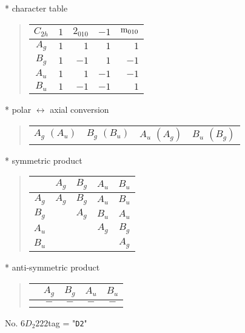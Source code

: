 \documentclass[fleqn,10pt,landscape]{jsarticle}
\begin{document}
* character table
\begin{quote}
\begin{tabular}{crrrr} \hline \hline
$ C_{2h} $ & $ 1 $ & $ 2{}_{010} $ & $ -1 $ & $ {\rm m}_{010} $ \\ \hline
$ A_{g} $ & $ 1 $ & $ 1 $ & $ 1 $ & $ 1 $ \\
$ B_{g} $ & $ 1 $ & $ -1 $ & $ 1 $ & $ -1 $ \\
$ A_{u} $ & $ 1 $ & $ 1 $ & $ -1 $ & $ -1 $ \\
$ B_{u} $ & $ 1 $ & $ -1 $ & $ -1 $ & $ 1 $ \\
 \hline \hline
\end{tabular}
\end{quote}
* polar $\leftrightarrow$ axial conversion
\begin{quote}
\begin{tabular}{cccc}
$ A_{g}\,\,(A_{u}) $ & $ B_{g}\,\,(B_{u}) $ & $ A_{u}\,\,(A_{g}) $ & $ B_{u}\,\,(B_{g}) $
\end{tabular}
\end{quote}
* symmetric product
\begin{quote}
\begin{tabular}{c|cccc} \hline \hline
 & $ A_{g} $ & $ B_{g} $ & $ A_{u} $ & $ B_{u} $ \\ \hline
$ A_{g} $ & $ A_{g} $ & $ B_{g} $ & $ A_{u} $ & $ B_{u} $ \\
$ B_{g} $ & $  $ & $ A_{g} $ & $ B_{u} $ & $ A_{u} $ \\
$ A_{u} $ & $  $ & $  $ & $ A_{g} $ & $ B_{g} $ \\
$ B_{u} $ & $  $ & $  $ & $  $ & $ A_{g} $ \\
 \hline \hline
\end{tabular}
\end{quote}
* anti-symmetric product
\begin{quote}
\begin{tabular}{ccccc} \hline \hline
 & $ A_{g} $ & $ B_{g} $ & $ A_{u} $ & $ B_{u} $ \\ \hline
$  $ & $ - $ & $ - $ & $ - $ & $ - $ \\
 \hline \hline
\end{tabular}
\end{quote}
\newpage
No. 6\quad$D_{2}$\quad$222$\quad[ orthorhombic ]
tag = "{\tt D2}"
\end{document}
